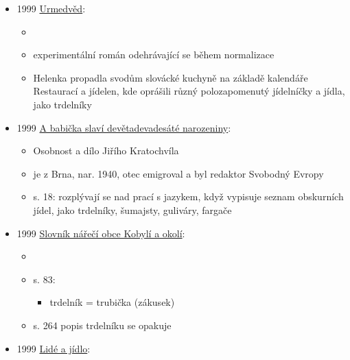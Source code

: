 \begin{itemize}
  \begin{itemize}
  \tightlist
  \item
    časopis Správy Krkonošského národního parku, 1999, č. 9, s. 35
  \item
    Co se vařívalo na poutích a posvíceních
  \item
    na posvícení došlo na husy, kachny, kuřata, krocany, ale i na pašíka
    leckde, obarovici, trdelníky, dandule, presbuřty, pekly koláče
    skládance, roháče a hnětýnky
  \end{itemize}
\item
  1999
  \href{https://ceskadigitalniknihovna.cz/uuid/uuid:b931b0f0-a760-11e7-ae0a-005056827e52}{Urmedvěd}:

  \begin{itemize}
  \tightlist
  \item
  \item
    experimentální román odehrávající se během normalizace
  \item
    Helenka propadla svodům slovácké kuchyně na základě kalendáře
    Restaurací a jídelen, kde oprášili různý polozapomenutý jídelníčky a
    jídla, jako trdelníky
  \end{itemize}
\item
  1999
  \href{https://www.digitalniknihovna.cz/mzk/uuid/uuid:006e9b70-a7fe-11e7-920d-005056827e51}{A
  babička slaví devětadevadesáté narozeniny}:

  \begin{itemize}
  \tightlist
  \item
    Osobnost a dílo Jiřího Kratochvíla
  \item
    je z Brna, nar. 1940, otec emigroval a byl redaktor Svobodný Evropy
  \item
    s. 18: rozplývají se nad prací s jazykem, když vypisuje seznam
    obskurních jídel, jako trdelníky, šumajsty, guliváry, fargače
  \end{itemize}
\item
  1999
  \href{https://ndk.cz/uuid/uuid:4ab24e70-fd82-11ef-b1df-5ef3fc9bb22f}{Slovník
  nářečí obce Kobylí a okolí}:

  \begin{itemize}
  \tightlist
  \item
     
  \item
    s. 83:

    \begin{itemize}
    \tightlist
    \item
      trdelník = trubička (zákusek)
    \end{itemize}
  \item
    s. 264 popis trdelníku se opakuje
  \end{itemize}
\item
  1999
  \href{https://www.digitalniknihovna.cz/mzk/uuid/uuid:fa9914e0-3558-11e7-8e0f-005056827e52}{Lidé
  a jídlo}:


\end{itemize}
